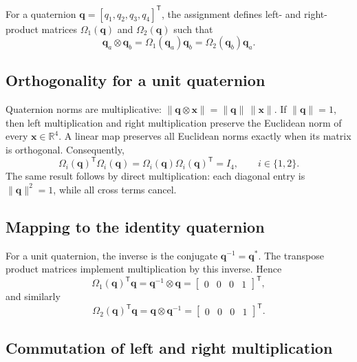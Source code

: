 \documentclass[11pt,a4paper]{article}
\newcommand{\vect}[1]{\bm{#1}}
\newcommand{\R}{\mathbb{R}}
\begin{document}
For a quaternion $\vect{q}=[q_1,q_2,q_3,q_4]^{\mathsf T}$, the assignment defines left- and right-product matrices $\Omega_1(\vect{q})$ and $\Omega_2(\vect{q})$ such that
\begin{equation}
\vect{q}_a\otimes\vect{q}_b
=\Omega_1(\vect{q}_a)\vect{q}_b
=\Omega_2(\vect{q}_b)\vect{q}_a.
\end{equation}

\subsection{Orthogonality for a unit quaternion}

Quaternion norms are multiplicative:
$\|\vect{q}\otimes\vect{x}\|=\|\vect{q}\|\,\|\vect{x}\|$. If $\|\vect{q}\|=1$, then left multiplication and right multiplication preserve the Euclidean norm of every $\vect{x}\in\R^4$. A linear map preserves all Euclidean norms exactly when its matrix is orthogonal. Consequently,
\begin{equation}
\Omega_i(\vect{q})^{\mathsf T}\Omega_i(\vect{q})
=\Omega_i(\vect{q})\Omega_i(\vect{q})^{\mathsf T}=I_4,
\qquad i\in\{1,2\}.
\end{equation}
The same result follows by direct multiplication: each diagonal entry is $\|\vect{q}\|^2=1$, while all cross terms cancel.

\subsection{Mapping to the identity quaternion}

For a unit quaternion, the inverse is the conjugate $\vect{q}^{-1}=\vect{q}^{*}$. The transpose product matrices implement multiplication by this inverse. Hence
\begin{equation}
\Omega_1(\vect{q})^{\mathsf T}\vect{q}
=\vect{q}^{-1}\otimes\vect{q}
=\begin{bmatrix}0&0&0&1\end{bmatrix}^{\mathsf T},
\end{equation}
and similarly
\begin{equation}
\Omega_2(\vect{q})^{\mathsf T}\vect{q}
=\vect{q}\otimes\vect{q}^{-1}
=\begin{bmatrix}0&0&0&1\end{bmatrix}^{\mathsf T}.
\end{equation}

\subsection{Commutation of left and right multiplication}
\end{document}
